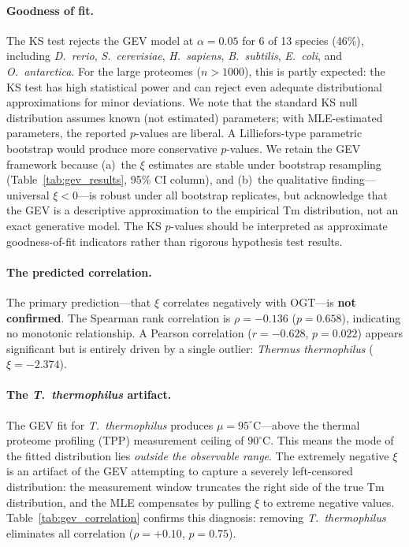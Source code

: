 \paragraph{Goodness of fit.} The KS test rejects the GEV model at $\alpha = 0.05$ for 6 of 13 species (46\%), including \textit{D.\ rerio}, \textit{S.\ cerevisiae}, \textit{H.\ sapiens}, \textit{B.\ subtilis}, \textit{E.\ coli}, and \textit{O.\ antarctica}. For the large proteomes ($n > 1000$), this is partly expected: the KS test has high statistical power and can reject even adequate distributional approximations for minor deviations. We note that the standard KS null distribution assumes known (not estimated) parameters; with MLE-estimated parameters, the reported $p$-values are liberal. A Lilliefors-type parametric bootstrap would produce more conservative $p$-values. We retain the GEV framework because (a)~the $\xi$ estimates are stable under bootstrap resampling (Table~\ref{tab:gev_results}, 95\% CI column), and (b)~the qualitative finding---universal $\xi < 0$---is robust under all bootstrap replicates, but acknowledge that the GEV is a descriptive approximation to the empirical Tm distribution, not an exact generative model. The KS $p$-values should be interpreted as approximate goodness-of-fit indicators rather than rigorous hypothesis test results.

\paragraph{The predicted correlation.} The primary prediction---that $\xi$ correlates negatively with OGT---is \textbf{not confirmed}. The Spearman rank correlation is $\rho = -0.136$ ($p = 0.658$), indicating no monotonic relationship. A Pearson correlation ($r = -0.628$, $p = 0.022$) appears significant but is entirely driven by a single outlier: \textit{Thermus thermophilus} ($\xi = -2.374$).

\paragraph{The \textit{T.\ thermophilus} artifact.} The GEV fit for \textit{T.\ thermophilus} produces $\mu = 95^\circ$C---above the thermal proteome profiling (TPP) measurement ceiling of $90^\circ$C. This means the mode of the fitted distribution lies \emph{outside the observable range}. The extremely negative $\xi$ is an artifact of the GEV attempting to capture a severely left-censored distribution: the measurement window truncates the right side of the true Tm distribution, and the MLE compensates by pulling $\xi$ to extreme negative values. Table~\ref{tab:gev_correlation} confirms this diagnosis: removing \textit{T.\ thermophilus} eliminates all correlation ($\rho = +0.10$, $p = 0.75$).


